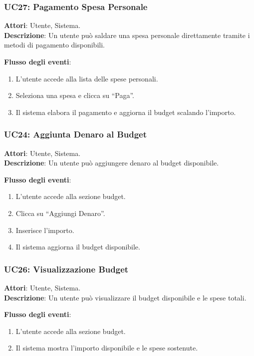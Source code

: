 \subsubsection{UC27: Pagamento Spesa Personale}
\textbf{Attori}: Utente, Sistema. \\
\textbf{Descrizione}: Un utente può saldare una spesa personale direttamente tramite i metodi di pagamento disponibili.

\textbf{Flusso degli eventi}:
\begin{enumerate}
    \item L’utente accede alla lista delle spese personali.
    \item Seleziona una spesa e clicca su ``Paga''.
    \item Il sistema elabora il pagamento e aggiorna il budget scalando l’importo.
\end{enumerate}

\subsubsection{UC24: Aggiunta Denaro al Budget}
\textbf{Attori}: Utente, Sistema. \\
\textbf{Descrizione}: Un utente può aggiungere denaro al budget disponibile.

\textbf{Flusso degli eventi}:
\begin{enumerate}
    \item L’utente accede alla sezione budget.
    \item Clicca su ``Aggiungi Denaro''.
    \item Inserisce l’importo.
    \item Il sistema aggiorna il budget disponibile.
\end{enumerate}

\subsubsection{UC26: Visualizzazione Budget}
\textbf{Attori}: Utente, Sistema. \\
\textbf{Descrizione}: Un utente può visualizzare il budget disponibile e le spese totali.

\textbf{Flusso degli eventi}:
\begin{enumerate}
    \item L’utente accede alla sezione budget.
    \item Il sistema mostra l’importo disponibile e le spese sostenute.
\end{enumerate}

